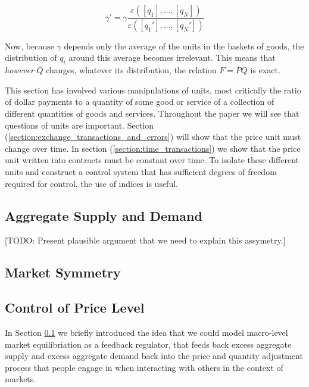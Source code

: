 \begin{equation}
    \gamma' =  \gamma \frac {\varepsilon \left( \left[ q_1 \right], \dots, \left[ q_N \right] \right)}
    {\varepsilon \left( \left[ {q_1}' \right], \dots, \left[ {q_N}' \right] \right)}
\end{equation}

Now, because $\gamma$ depends only the average of the units in the baskets of goods, the distribution of
$q_i$ around this average becomes irrelevant. This means that \textit{however} $\overline Q$
changes, whatever its distribution, the relation $F=PQ$ is exact.  

This section has involved various manipulations of units, most critically the ratio of dollar
payments to a quantity of some good or service of a collection of different quantities of goods and
services. Throughout the paper we will see that questions of units are important. Section
(\ref{section:exchange_transactions_and_errors}) will show that the price unit must change over
time. In section (\ref{section:time_transactions}) we show that the price unit written into
contracts must be constant over time. To isolate these different units and construct a control
system that has sufficient degrees of freedom required for control, the use of indices is useful.

\subsection{Aggregate Supply and Demand}
\label{section:aggregate_supply_and_demand}





[TODO: Present plausible argument that we need to explain this assymetry.]

\subsection{Market Symmetry}

\subsection{Control of Price Level}

In Section \ref{section:aggregate_supply_and_demand} we briefly introduced the idea that we could model
macro-level market equilibriation as a feedback regulator, that feeds back excess aggregate supply
and excess aggregate demand back into the price and quantity adjustment process that people engage
in when interacting with others in the context of markets. 

